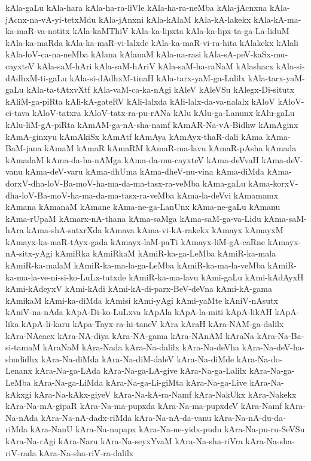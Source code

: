 {kAla-gaLu
kAla-hara
kAla-ha-ra-liVle
kAla-ha-ra-neMba
kAla-jAcnxna
kAla-jAcnx-na-vA-yi-tetxMdu
kAla-jAnxni
kAla-kAlaM
kAla-kA-lakekx
kAla-kA-ma-ka-maR-va-notitx
kAla-kaMThiV
kAla-ka-lipxta
kAla-ka-lipx-ta-ga-La-liduM
kAla-ka-maRda
kAla-ka-maR-vi-lalxde
kAla-ka-maR-vi-ra-hita
kAlakekx
kAlali
kAla-loV-ca-na-neMba
kAlana
kAlanaM
kAla-na-rasi
kAla-sA-peV-kaSx-mu-cayxteV
kAla-saM-hAri
kAla-saM-hAriV
kAla-saM-ha-raNaM
kAlashacx
kAla-si-dAdhxM-ti-gaLu
kAla-si-dAdhxM-tinaH
kAla-tarx-yaM-ga-Lalilx
kAla-tarx-yaM-gaLu
kAla-ta-tAtxvXtf
kAla-vaM-ca-ka-nAgi
kAleV
kAleVSu
kAlegx-Di-situtx
kAliM-ga-piRta
kAli-kA-gateRV
kAli-lalxda
kAli-lalx-da-va-nalalx
kAloV
kAloV-ci-tava
kAloV-tatxra
kAloV-tatx-ra-pu-rANa
kAlu
kAlu-ga-Lanunx
kAlu-gaLu
kAlu-liM-gA-piRta
kAmAM-ga-nA-sha-namf
kAmAR-Na-vA-Bidhw
kAmAginx
kAmA-ginxyu
kAmAkiSx
kAmAtf
kAmAya
kAmAyx-thaR-dali
kAma
kAma-BaM-jana
kAmaM
kAmaR
kAmaRM
kAmaR-ma-lavu
kAmaR-pAsha
kAmada
kAmadaM
kAma-da-ha-nAMga
kAma-da-mu-cayxteV
kAma-deVvaH
kAma-deV-vanu
kAma-deV-varu
kAma-dhUma
kAma-dheV-nu-vina
kAma-diMda
kAma-dorxV-dha-loV-Ba-moV-ha-ma-da-ma-tasx-ra-veMba
kAma-gaLu
kAma-korxV-dha-loV-Ba-moV-ha-ma-da-ma-tasx-ra-veMba
kAma-la-deVvi
kAmamamx
kAmana
kAmanaM
kAmane
kAma-ne-ga-LanUnx
kAma-ne-gaLu
kAmanu
kAma-rUpaM
kAmarx-nA-thana
kAma-saMga
kAma-saM-ga-va-Lidu
kAma-saM-hAra
kAma-shA-satxrXda
kAmava
kAma-vi-kA-rakekx
kAmayx
kAmayxM
kAmayx-ka-maR-tAyx-gada
kAmayx-laM-paTi
kAmayx-liM-gA-caRne
kAmayx-nA-sitx-yAgi
kAmiRka
kAmiRkaM
kAmiR-ka-ga-LeMba
kAmiR-ka-mala
kAmiR-ka-malaM
kAmiR-ka-ma-la-ga-LeMba
kAmiR-ka-ma-la-veMba
kAmiR-ka-ma-la-ve-ni-si-ko-LuLx-tatxde
kAmiR-ka-ma-lavu
kAmi-gaLu
kAmi-kAdAyxH
kAmi-kAdeyxV
kAmi-kAdi
kAmi-kA-di-parx-BeV-deVna
kAmi-kA-gama
kAmikaM
kAmi-ka-diMda
kAmisi
kAmi-yAgi
kAmi-yaMte
kAniV-nAsutx
kAniV-na-nAda
kApA-Di-ko-LuLxva
kApAla
kApA-la-miti
kApA-likAH
kApA-lika
kApA-li-karu
kApa-Tayx-ra-hi-taneV
kAra
kAraH
kAra-NAM-ga-dalilx
kAra-NAcacx
kAra-NA-diya
kAra-NA-gama
kAra-NAnAM
kAraNa
kAra-Na-Ba-si-tamaM
kAraNaM
kAra-Nada
kAra-Na-dalilx
kAra-Na-deVha
kAra-Na-deV-ha-shudidhx
kAra-Na-diMda
kAra-Na-diM-daleV
kAra-Na-diMde
kAra-Na-do-Lenanx
kAra-Na-ga-LAda
kAra-Na-ga-LA-give
kAra-Na-ga-Lalilx
kAra-Na-ga-LeMba
kAra-Na-ga-LiMda
kAra-Na-ga-Li-giMta
kAra-Na-ga-Live
kAra-Na-kAkxgi
kAra-Na-kAkx-giyeV
kAra-Na-kA-ra-Namf
kAra-NakUkx
kAra-Nakekx
kAra-Na-mA-gipaR
kAra-Na-ma-pupxda
kAra-Na-ma-pupxdeV
kAra-Namf
kAra-Na-nAda
kAra-Na-nA-dadx-riMda
kAra-Na-nA-da-vanu
kAra-Na-nA-du-da-riMda
kAra-NanU
kAra-Na-napapx
kAra-Na-ne-yidx-pudu
kAra-Na-pu-ru-SeVSu
kAra-Na-rAgi
kAra-Naru
kAra-Na-seyxYvaM
kAra-Na-sha-riVra
kAra-Na-sha-riV-rada
kAra-Na-sha-riV-ra-dalilx
}
